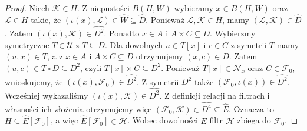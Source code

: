 \begin{proof}
Niech $\mathcal K\in H$.
Z niepustości $B(H,W)$
wybieramy $x\in B(H,W)$
oraz $\mathcal L\in H$ takie, że
$(\iota(x),\mathcal L)\in\widehat W
\subseteq\widehat D$.
Ponieważ $\mathcal L,\mathcal K\in H$,
mamy $(\mathcal L,\mathcal K)\in\widehat D$.
Zatem
$(\iota(x),\mathcal K)\in\widehat{D^2}$.
Ponadto $x\in A$ i
$A\times C\subseteq D$.
Wybierzmy symetryczne $T\in\mathcal U$
z $T\subseteq D$. Dla dowolnych $u\in T[x]$ i $c\in C$
z symetrii $T$ mamy $(u,x)\in T$,
a z $x\in A$ i $A\times C\subseteq D$
otrzymujemy $(x,c)\in D$.
Zatem $(u,c)\in T\circ D\subseteq D^2$,
czyli $T[x]\times C\subseteq D^2$.
Ponieważ $T[x]\in\mathcal N_x$ oraz
$C\in\mathcal F_0$, wnioskujemy, że
$(\iota(x),\mathcal F_0)\in\widehat{D^2}$.
Z symetrii $D^2$ także
$(\mathcal F_0,\iota(x))\in\widehat{D^2}$.
Wcześniej wykazaliśmy
$(\iota(x),\mathcal K)\in\widehat{D^2}$.
Z definicji relacji na filtrach
i własności ich złożenia otrzymujemy więc
$(\mathcal F_0,\mathcal K)
\in\widehat{D^4}\subseteq\widehat E$.
Oznacza to
$H\subseteq\widehat E[\mathcal F_0]$,
a więc $\widehat E[\mathcal F_0]\in\mathcal H$.
Wobec dowolności $E$
filtr $\mathcal H$ zbiega do $\mathcal F_0$.
\end{proof}

